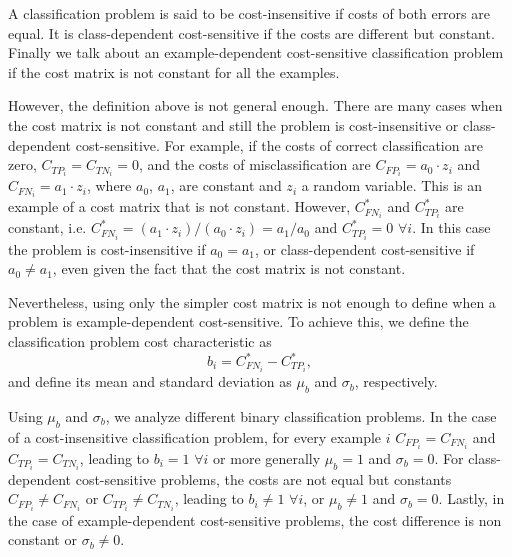  A classification problem is said to be cost-insensitive if costs of both errors are equal. It 
    is class-dependent cost-sensitive if the costs are different but constant. Finally we talk 
    about an example-dependent cost-sensitive classification problem if the cost matrix is not 
    constant for all the examples.
  
    However, the definition above is not general enough. There are many cases when the cost matrix 
    is not constant and still the problem is cost-insensitive or class-dependent cost-sensitive. 
    For example, if the costs of correct classification are zero, $C_{TP_i}=C_{TN_i}=0$, 
    and the costs of misclassification are $C_{FP_i}=a_0\cdot z_i$ and $C_{FN_i}=a_1\cdot z_i$,
    where $a_0$, $a_1$, are constant and $z_i$ a random variable. This is an example of a cost 
    matrix that is not constant. However, $C^*_{FN_i}$ and $C^*_{TP_i}$ are constant, i.e. 
    $C^*_{FN_i}=(a_1\cdot z_i)/(a_0\cdot z_i)=a_1/a_0$ and $C^*_{TP_i}=0$ $\forall i$. In 
    this case the problem is cost-insensitive if $a_0=a_1$, or class-dependent cost-sensitive if 
    $a_0 \ne a_1$, even given the fact that the cost matrix is not constant.
  
    Nevertheless, using only the simpler cost matrix is not enough to define when a problem is 
    example-dependent cost-sensitive. To achieve this, we define the classification problem cost 
    characteristic as 
    \begin{equation}
     b_i = C^*_{FN_i}-C^*_{TP_i},
    \end{equation}
    and define its mean and standard deviation as $\mu_b$ and $\sigma_b$, respectively.
  
    Using $\mu_b$ and $\sigma_b$, we analyze different binary classification problems. In the case 
    of a cost-insensitive classification problem, for every example $i$ \mbox{$C_{FP_i}=C_{FN_i}$}
    and $C_{TP_i}=C_{TN_i}$, leading to $b_i=1$ $\forall i$ or more generally $\mu_b=1$ and 
    $\sigma_b=0$. For class-dependent cost-sensitive problems, the costs are not equal but 
    constants \mbox{$C_{FP_i}\ne C_{FN_i}$} or \mbox{$C_{TP_i}\ne C_{TN_i}$}, leading to $b_i \ne 
    1$ $\forall i$, or $\mu_b \ne 1$ and $\sigma_b=0$. Lastly, in the case of example-dependent 
    cost-sensitive problems, the cost difference is non constant or $\sigma_b \ne 0$.
  
